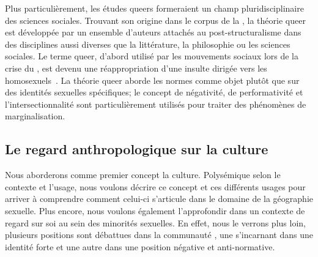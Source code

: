 Plus particulièrement, les études queers formeraient un champ pluridisciplinaire des sciences sociales.
Trouvant son origine dans le corpus de la , la théorie queer est développée par un ensemble d'auteurs attachés au post-structuralisme dans des disciplines aussi diverses que la littérature, la philosophie ou les sciences sociales.
Le terme queer, d'abord utilisé par les mouvements sociaux \lgbt{} lors de la crise du \sida, est devenu une réappropriation d'une insulte dirigée vers les homosexuels~\citep{Laprade2014}.
La théorie queer aborde les normes  comme objet plutôt que sur des identités sexuelles spécifiques; le concept de négativité, de performativité et l'intersectionnalité sont particulièrement utilisés pour traiter des phénomènes de marginalisation.

\subsection{Le regard anthropologique sur la culture}
\label{subsec:le_regard_anthropologique_sur_la_culture}
Nous aborderons comme premier concept la culture.
Polysémique selon le contexte et l'usage, nous voulons décrire ce concept et ces différents usages pour arriver à comprendre comment celui-ci s'articule dans le domaine de la géographie sexuelle.
Plus encore, nous voulons également l'approfondir dans un contexte de regard sur soi au sein des minorités sexuelles.
En effet, nous le verrons plus loin, plusieurs positions sont débattues dans la communauté \lgbt{}, une s'incarnant dans une identité forte et une autre dans une position négative et anti-normative.


